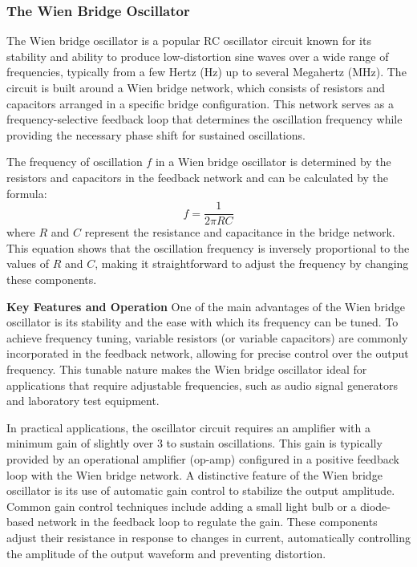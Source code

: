 \documentclass[12pt,a4paper]{article}
\begin{document}
    \subsubsection{The Wien Bridge Oscillator}
    The Wien bridge oscillator is a popular RC oscillator circuit known for its stability and ability to produce low-distortion sine waves over a wide range of frequencies, typically from a few Hertz (Hz) up to several Megahertz (MHz). The circuit is built around a Wien bridge network, which consists of resistors and capacitors arranged in a specific bridge configuration. This network serves as a frequency-selective feedback loop that determines the oscillation frequency while providing the necessary phase shift for sustained oscillations.

    The frequency of oscillation \( f \) in a Wien bridge oscillator is determined by the resistors and capacitors in the feedback network and can be calculated by the formula:
    \[
    f = \frac{1}{2 \pi R C}
    \]
    where \( R \) and \( C \) represent the resistance and capacitance in the bridge network. This equation shows that the oscillation frequency is inversely proportional to the values of \( R \) and \( C \), making it straightforward to adjust the frequency by changing these components.

    \textbf{Key Features and Operation}
    One of the main advantages of the Wien bridge oscillator is its stability and the ease with which its frequency can be tuned. To achieve frequency tuning, variable resistors (or variable capacitors) are commonly incorporated in the feedback network, allowing for precise control over the output frequency. This tunable nature makes the Wien bridge oscillator ideal for applications that require adjustable frequencies, such as audio signal generators and laboratory test equipment.

    In practical applications, the oscillator circuit requires an amplifier with a minimum gain of slightly over 3 to sustain oscillations. This gain is typically provided by an operational amplifier (op-amp) configured in a positive feedback loop with the Wien bridge network. A distinctive feature of the Wien bridge oscillator is its use of automatic gain control to stabilize the output amplitude. Common gain control techniques include adding a small light bulb or a diode-based network in the feedback loop to regulate the gain. These components adjust their resistance in response to changes in current, automatically controlling the amplitude of the output waveform and preventing distortion.
\end{document}
